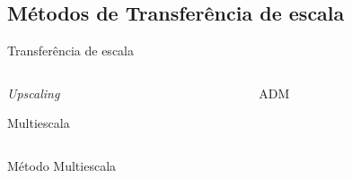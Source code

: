 \documentclass[professionalfont]{beamer}
\begin{document}
\subsection{Métodos de Transferência de escala}
\begin{frame}{Transferência de escala}

    \begin{columns}
        \begin{column}{0.5\textwidth}
            \centering
            \resizebox*{5cm}{!}{
            }

            \textit{\small Upscaling}

            \vspace{0.3cm}

            \resizebox*{6.5cm}{!}{
            }

            {\small Multiescala}
        \end{column}
        
        \begin{column}{0.5\textwidth}
            \centering
            \resizebox*{6cm}{!}{
            }

            {\small ADM}
        \end{column}
    \end{columns}
    
\end{frame}

        

\begin{frame}{Método Multiescala}
    \begin{figure}[!ht]
        \begin{subfigure}{.48\textwidth}
            \centering
            \resizebox*{5cm}{!}{
            }
            \label{fig:multiescala.2.a}
        \end{subfigure}
        \begin{subfigure}{.48\textwidth}
            \centering
            \resizebox*{5cm}{!}{
            }
            \label{fig:multiescala.2.b}
        \end{subfigure}
        \label{fig:multiescala.2}
    \end{figure}
\end{frame}
\end{document}
